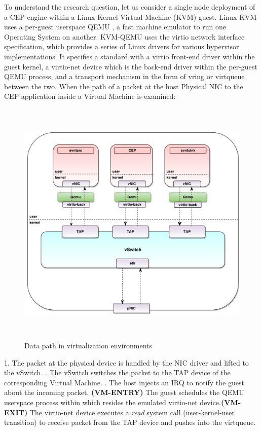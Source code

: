 To understand the research question, let us consider a single node deployment of a CEP engine within a Linux Kernel Virtual Machine (KVM) \cite{kivity2007kvm} guest. Linux KVM uses a per-guest userspace QEMU \cite{bellard2005qemu}, a fast machine emulator to run one Operating System on another. KVM-QEMU uses the virtio \cite{russell2008virtio} network interface specification, which provides a series of Linux drivers for various hypervisor implementations. It specifies a standard with a virtio front-end driver within the guest kernel, a virtio-net device which is the back-end driver within the per-guest QEMU process, and a transport mechanism in the form of vring or virtqueue between the two. When the path of a packet at the host Physical NIC to the CEP application inside a Virtual Machine is examined: 
 \begin{figure}[H]
	\centering
	\caption{Data path in virtualization environments} 
	\includegraphics[height=12cm]{Vswitch05.pdf}
\end{figure}
1. The packet at the physical device is handled by the NIC driver and lifted to the vSwitch. . The vSwitch switches the packet to the TAP device of the corresponding Virtual Machine. \newline {}. The host injects an IRQ to notify the guest about the incoming packet. \textbf{(VM-ENTRY)} The guest schedules the QEMU userspace process within which resides  the emulated virtio-net device.\textbf{(VM-EXIT)} The virtio-net device executes a \textit{read} system call (user-kernel-user transition) to receive packet from the TAP device and pushes into the virtqueue.   \newline \newline 
